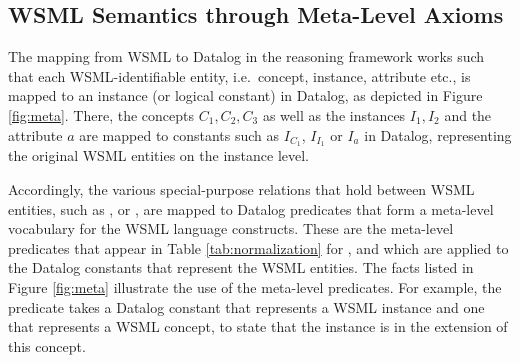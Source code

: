\subsection{WSML Semantics through Meta-Level Axioms}
\label{sec:meta}

The mapping from WSML to Datalog in the reasoning framework works
such that each WSML-identifiable entity, i.e.\ concept, instance,
attribute etc., is mapped to an instance (or logical constant) in
Datalog, as depicted in Figure \ref{fig:meta}. There, the concepts
$C_1, C_2, C_3$ as well as the instances $I_1, I_2$ and the
attribute $a$ are mapped to constants such as $I_{C_1}$, $I_{I_1}$
or $I_a$ in Datalog, representing the original WSML entities on
the instance level.

Accordingly, the various special-purpose relations that hold
between WSML entities, such as ,
 or , are mapped to Datalog
predicates that form a meta-level vocabulary for the WSML language
constructs. These are the meta-level predicates that appear in
Table \ref{tab:normalization} for \transdlog, and which are
applied to the Datalog constants that represent the WSML entities.
The facts listed in Figure \ref{fig:meta} illustrate the use of
the meta-level predicates. For example,
%
%
the predicate \pmo takes a Datalog constant that represents a WSML
instance and one that represents a WSML concept, to state that the
instance is in the extension of this concept.

